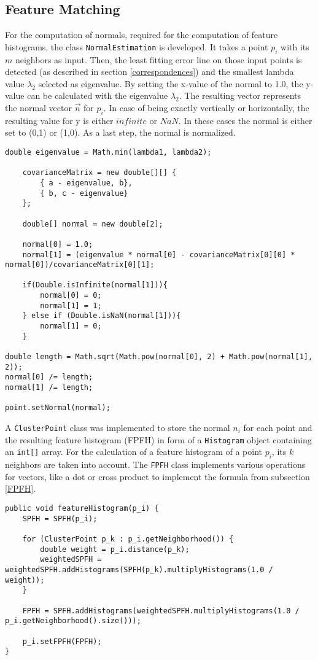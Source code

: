 \subsection{Feature Matching}
\label{FeatureMatching}
For the computation of normals, required for the computation of feature histograms, the class \texttt{NormalEstimation} is developed. It takes a point $p_i$ with its $m$ neighbors as input. Then, the least fitting error line on those input points is detected (as described in section \ref{correspondences}) and the smallest lambda value $\lambda_2$ selected as eigenvalue. By setting the x-value of the normal to 1.0, the y-value can be calculated with the eigenvalue $\lambda_2$. The resulting vector represents the normal vector $\vec{n}$ for $p_i$. In case of being exactly vertically or horizontally, the resulting value for y is either $infinite$ or $NaN$. In these cases the normal is either set to (0,1) or (1,0). As a last step, the normal is normalized.
\begin{lstlisting}
double eigenvalue = Math.min(lambda1, lambda2);

	covarianceMatrix = new double[][] { 
		{ a - eigenvalue, b},
		{ b, c - eigenvalue}
	};

	double[] normal = new double[2];

	normal[0] = 1.0;
	normal[1] = (eigenvalue * normal[0] - covarianceMatrix[0][0] * normal[0])/covarianceMatrix[0][1];

	if(Double.isInfinite(normal[1])){
		normal[0] = 0;
		normal[1] = 1;
	} else if (Double.isNaN(normal[1])){
		normal[1] = 0;
	}

double length = Math.sqrt(Math.pow(normal[0], 2) + Math.pow(normal[1], 2));
normal[0] /= length;
normal[1] /= length;

point.setNormal(normal);
\end{lstlisting}
A \texttt{ClusterPoint} class was implemented to store the normal $n_i$ for each point and the resulting feature histogram (FPFH) in form of a \texttt{Histogram} object containing an \texttt{int[]} array. For the calculation of a feature histogram of a point $p_i$, its $k$ neighbors are taken into account. The \texttt{FPFH} class implements various operations for vectors, like a dot or cross product to implement the formula from subsection \ref{FPFH}.
\begin{lstlisting}
public void featureHistogram(p_i) {
	SPFH = SPFH(p_i);

	for (ClusterPoint p_k : p_i.getNeighborhood()) {
		double weight = p_i.distance(p_k);
		weightedSPFH = weightedSPFH.addHistograms(SPFH(p_k).multiplyHistograms(1.0 / weight));
	}
	
	FPFH = SPFH.addHistograms(weightedSPFH.multiplyHistograms(1.0 / p_i.getNeighborhood().size()));
	
	p_i.setFPFH(FPFH);
}
\end{lstlisting}

